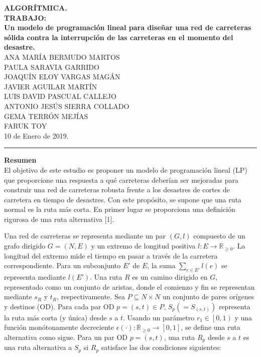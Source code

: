 \documentclass[10pt]{report}
\author{M.Miranda}
\begin{document}
	\sloppy
	

\begin{center}
	\textbf{ALGOR\'ITMICA.}\\
	\textbf{TRABAJO:}\\
	\textbf{Un modelo de programación lineal para diseñar una red de carreteras sólida contra la interrupción de las carreteras en el momento del desastre.}\\	
	\textsc{ANA MARÍA BERMUDO MARTOS}\\
	\textsc{PAULA SARAVIA GARRIDO}\\
	\textsc{JOAQUÍN ELOY VARGAS MAGÁN}\\
	\textsc{JAVIER AGUILAR MARTÍN}\\
	\textsc{LUIS DAVID PASCUAL CALLEJO}\\
	\textsc{ANTONIO JES\'US SIERRA COLLADO}\\
	\textsc{GEMA TERR\'ON MEJ\'IAS}\\
    \textsc{FARUK TOY}\\
	10 de Enero de 2019.
	\noindent\rule{15.3cm}{0.4pt}
\end{center}
\textbf{Resumen}\\


El objetivo de este estudio es proponer un modelo de programaci\'on lineal (LP) que proporcione una respuesta a  qu\'e carreteras deber\'ian ser mejoradas para construir una red de carreteras robusta frente a los desastres de cortes de carretera en tiempo de desastres. Con este prop\'osito, se supone que una ruta normal es la ruta más corta. En primer lugar se proporciona una definición rigurosa de una ruta alternativa [1].
 
 Una red de carreteras se representa mediante un par $\left( G, l\right)$ compuesto de un grafo dirigido $G=\left( N, E\right)$ y un extremo de longitud positiva $l:E\longrightarrow \mathbb{R}_{\geq 0}$. La longitud del extremo mide  el tiempo en pasar a través de la carretera correspondiente. Para un subconjunto $E'$ de $E$, la suma $\sum_{e\in E '}l\left( e\right)$ se representa mediante $l\left( E' \right)$. Una ruta $R$ es un camino dirigido en $G$, representado como un conjunto  de aristas, donde el  comienzo y fin se representan mediante $s_{R}$ y $t_{R}$, respectivamente. Sea $P \subseteq N \times N$ un conjunto de pares orígenes y destinos (OD). Para cada par OD $p = \left( s, t\right) \in P$, $S_{p}\left( = S_{\left( s, t\right)}\right)$ representa la ruta más corta (y única) desde $s$ a $t$. Usando un parámetro $r_{1}\in \left[ 0, 1\right)$ y una función monótonamente decreciente $\epsilon \left( \cdot \right): \mathbb{R}_{\geq 0} \longrightarrow \left[ 0,1\right]$, se define una ruta alternativa como sigue. Para un par OD $p=\left( s, t \right)$, una ruta $R_{p}$ desde $s$ a $t$ es una ruta alternativa a $S_{p}$ si $R_{p}$ satisface las dos condiciones siguientes:
\end{document}
